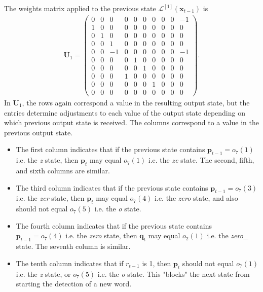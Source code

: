 \documentclass{somasmsc}
\begin{document}
The weights matrix applied to the previous state $\mathcal{L}^{\left[1\right]}\left(\pmb{x}_{t-1}\right)$ is
\begin{align}
\mathbf{U}_1 =
\begin{pmatrix}
0 & 0 &  0 & 0 & 0 & 0 & 0 & 0 & 0 & -1\\
1 & 0 &  0 & 0 & 0 & 0 & 0 & 0 & 0 &  0\\
0 & 1 &  0 & 0 & 0 & 0 & 0 & 0 & 0 &  0\\
0 & 0 &  1 & 0 & 0 & 0 & 0 & 0 & 0 &  0\\
0 & 0 & -1 & 0 & 0 & 0 & 0 & 0 & 0 & -1\\
0 & 0 &  0 & 0 & 1 & 0 & 0 & 0 & 0 &  0\\
0 & 0 &  0 & 0 & 0 & 1 & 0 & 0 & 0 &  0\\
0 & 0 &  0 & 1 & 0 & 0 & 0 & 0 & 0 &  0\\
0 & 0 &  0 & 0 & 0 & 0 & 1 & 0 & 0 &  0\\
0 & 0 &  0 & 0 & 0 & 0 & 0 & 0 & 0 &  0
\end{pmatrix}.
\end{align}
In $\mathbf{U}_1$, the rows again correspond a value in the resulting output state, but the entries determine adjustments to each value of the output state depending on which previous output state is received. The columns correspond to a value in the previous output state.
\begin{itemize}
    \item The first column indicates that if the previous state contains $\pmb{p}_{t-1} = o_7(1)$ i.e. the \textit{z} state, then $\pmb{p}_t$ may equal $o_7(1)$ i.e. the \textit{ze} state. The second, fifth, and sixth columns are similar.
    \item The third column indicates that if the previous state contains $\pmb{p}_{t-1} = o_7(3)$ i.e. the \textit{zer} state, then $\pmb{p}_t$ may equal $o_7(4)$  i.e. the \textit{zero} state, and also should not equal $o_7(5)$ i.e. the \textit{o} state.
    \item The fourth column indicates that if the previous state contains $\pmb{p}_{t-1} = o_7(4)$ i.e. the \textit{zero} state, then $\pmb{q}_t$ may equal $o_2(1)$ i.e. the \textit{zero\_} state. The seventh column is similar.
    \item The tenth column indicates that if $r_{t-1}$ is 1, then $\pmb{p}_t$ should not equal $o_7(1)$ i.e. the \textit{z} state, or $o_7(5)$ i.e. the \textit{o} state. This "blocks" the next state from starting the detection of a new word.
\end{itemize}
\end{document}
